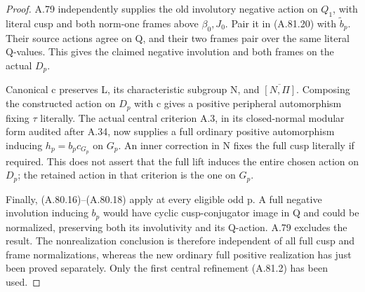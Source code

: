 \begin{proof}
A.79 independently supplies the old involutory
negative action on \(Q_1\), with literal cusp and
both norm-one frames above \(\beta_0,J_0\). Pair
it in (A.81.20) with \(\widetilde b_p\). Their
source actions agree on Q, and their two frames pair
over the same literal Q-values. This gives the
claimed negative involution and both frames on the
actual \(D_p\).

Canonical c preserves L, its characteristic subgroup
N, and \(\overline{[N,\Pi]}\). Composing the
constructed action on \(D_p\) with c gives a
positive peripheral automorphism fixing \(\tau\)
literally. The actual central criterion A.3, in its
closed-normal modular form audited after A.34, now
supplies a full ordinary positive automorphism inducing
\(h_p=b_pc_{G_p}\) on \(G_p\). An inner correction
in N fixes the full cusp literally if required.
This does not assert that the full lift induces the
entire chosen action on \(D_p\); the retained action
in that criterion is the one on \(G_p\).

Finally, (A.80.16)--(A.80.18) apply at every eligible
odd p. A full negative involution inducing \(b_p\)
would have cyclic cusp-conjugator image in Q and
could be normalized, preserving both its involutivity
and its Q-action. A.79 excludes the result. The
nonrealization conclusion is therefore independent
of all full cusp and frame normalizations, whereas
the new ordinary full positive realization has just
been proved separately. Only the first central
refinement (A.81.2) has been used.
\end{proof}
